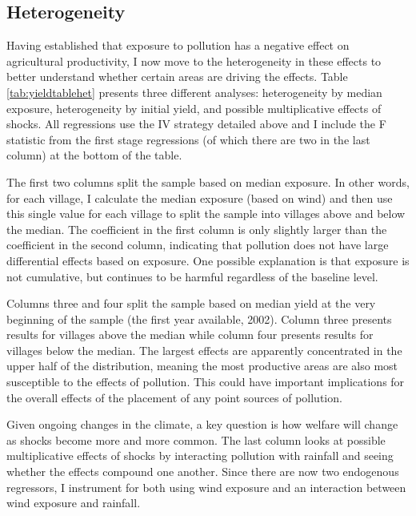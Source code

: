 \documentclass[
]{article}
\begin{document}
\hypertarget{heterogeneity}{%
\subsection{Heterogeneity}\label{heterogeneity}}

Having established that exposure to pollution has a negative effect on agricultural productivity, I now move to the heterogeneity in these effects to better understand whether certain areas are driving the effects. Table \ref{tab:yieldtablehet} presents three different analyses: heterogeneity by median exposure, heterogeneity by initial yield, and possible multiplicative effects of shocks. All regressions use the IV strategy detailed above and I include the F statistic from the first stage regressions (of which there are two in the last column) at the bottom of the table.

The first two columns split the sample based on median exposure. In other words, for each village, I calculate the median exposure (based on wind) and then use this single value for each village to split the sample into villages above and below the median. The coefficient in the first column is only slightly larger than the coefficient in the second column, indicating that pollution does not have large differential effects based on exposure. One possible explanation is that exposure is not cumulative, but continues to be harmful regardless of the baseline level.

Columns three and four split the sample based on median yield at the very beginning of the sample (the first year available, 2002). Column three presents results for villages above the median while column four presents results for villages below the median. The largest effects are apparently concentrated in the upper half of the distribution, meaning the most productive areas are also most susceptible to the effects of pollution. This could have important implications for the overall effects of the placement of any point sources of pollution.

Given ongoing changes in the climate, a key question is how welfare will change as shocks become more and more common. The last column looks at possible multiplicative effects of shocks by interacting pollution with rainfall and seeing whether the effects compound one another. Since there are now two endogenous regressors, I instrument for both using wind exposure and an interaction between wind exposure and rainfall.
\end{document}
